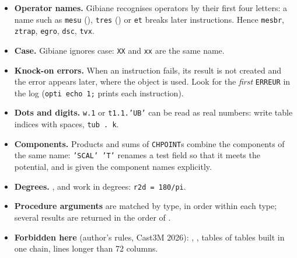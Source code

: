 \begin{itemize}[itemsep=1pt]
\item \textbf{Operator names.} Gibiane recognises operators by their first
four letters: a name such as \texttt{mesu} (), \texttt{tres}
() or \texttt{et} breaks later instructions. Hence \texttt{mesbr},
\texttt{ztrap}, \texttt{egro}, \texttt{dsc}, \texttt{tvx}.
\item \textbf{Case.} Gibiane ignores case: \texttt{XX} and \texttt{xx} are the
same name.
\item \textbf{Knock-on errors.} When an instruction fails, its result is not
created and the error appears later, where the object is used. Look for the
\emph{first} \texttt{ERREUR} in the log (\texttt{opti echo 1;} prints each
instruction).
\item \textbf{Dots and digits.} \texttt{w.1} or \texttt{t1.1.'UB'} can be read as
real numbers: write table indices with spaces, \texttt{tub . k}.
\item \textbf{Components.} Products and sums of \texttt{CHPOINT}s combine the
components of the same name:  \texttt{'SCAL' 'T'} renames a test
field so that it meets the potential, and  is given the component
names explicitly.
\item \textbf{Degrees.} ,  and  work in degrees:
\texttt{r2d = 180/pi}.
\item \textbf{Procedure arguments} are matched by type, in order within each
type; several results are returned in the order of .
\item \textbf{Forbidden here} (author's rules, Cast3M 2026): ,
, tables of tables built in one chain, lines longer than 72 columns.
\end{itemize}


